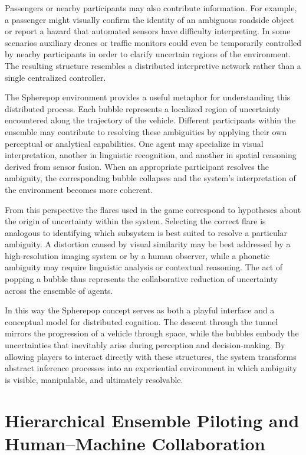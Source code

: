 \documentclass[11pt]{article}
\begin{document}
Passengers or nearby participants may also contribute information. For example, a passenger might visually confirm the identity of an ambiguous roadside object or report a hazard that automated sensors have difficulty interpreting. In some scenarios auxiliary drones or traffic monitors could even be temporarily controlled by nearby participants in order to clarify uncertain regions of the environment. The resulting structure resembles a distributed interpretive network rather than a single centralized controller.

The Spherepop environment provides a useful metaphor for understanding this distributed process. Each bubble represents a localized region of uncertainty encountered along the trajectory of the vehicle. Different participants within the ensemble may contribute to resolving these ambiguities by applying their own perceptual or analytical capabilities. One agent may specialize in visual interpretation, another in linguistic recognition, and another in spatial reasoning derived from sensor fusion. When an appropriate participant resolves the ambiguity, the corresponding bubble collapses and the system's interpretation of the environment becomes more coherent.

From this perspective the flares used in the game correspond to hypotheses about the origin of uncertainty within the system. Selecting the correct flare is analogous to identifying which subsystem is best suited to resolve a particular ambiguity. A distortion caused by visual similarity may be best addressed by a high-resolution imaging system or by a human observer, while a phonetic ambiguity may require linguistic analysis or contextual reasoning. The act of popping a bubble thus represents the collaborative reduction of uncertainty across the ensemble of agents.

In this way the Spherepop concept serves as both a playful interface and a conceptual model for distributed cognition. The descent through the tunnel mirrors the progression of a vehicle through space, while the bubbles embody the uncertainties that inevitably arise during perception and decision-making. By allowing players to interact directly with these structures, the system transforms abstract inference processes into an experiential environment in which ambiguity is visible, manipulable, and ultimately resolvable.

\section{Hierarchical Ensemble Piloting and Human--Machine Collaboration}
\end{document}

